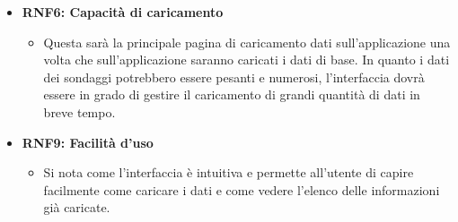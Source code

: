 \begin{itemize}
\begin{itemize}
        \end{itemize} 
        \item \textbf{RNF6: Capacità di caricamento} \begin{itemize}
            \item Questa sarà la principale pagina di caricamento dati sull'applicazione una volta che sull'applicazione saranno caricati i dati di base. In quanto i dati dei sondaggi potrebbero essere pesanti e numerosi, l'interfaccia dovrà essere in grado di gestire il caricamento di grandi quantità di dati in breve tempo.
        \end{itemize}
        \item \textbf{RNF9: Facilità d’uso} \begin{itemize}
            \item Si nota come l'interfaccia è intuitiva e permette all'utente di capire facilmente come caricare i dati e come vedere l'elenco delle informazioni già caricate.
        \end{itemize}
    \end{itemize}